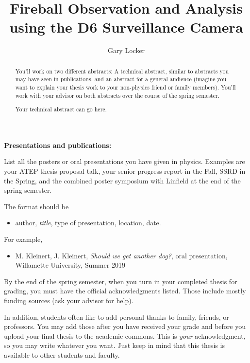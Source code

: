 \documentclass[12pt]{report}
\begin{document}
\title{Fireball Observation and Analysis using the D6 Surveillance Camera}
\author{Gary Locker}

\maketitle


\newpage

\begin{center}
\textbf{Presentations and publications:}
\end{center}

List all the posters or oral presentations you have given in physics. Examples are your ATEP thesis proposal talk, your senior progress report in the Fall, SSRD in the Spring, and the combined poster symposium with Linfield at the end of the spring semester.

The format should be 

\begin{itemize}
    \item author, \textit{title}, type of presentation, location, date. 
\end{itemize}

For example,
\begin{itemize}
\item M. Kleinert, J. Kleinert, \textit{Should we get another dog?}, oral presentation, Willamette University, Summer 2019
\end{itemize}

\newpage

\begin{acknowledgments}
By the end of the spring semester, when you turn in your completed thesis for grading, you must have the official acknowledgments listed. Those include mostly funding sources (ask your advisor for help). 

In addition, students often like to add personal thanks to family, friends, or professors. You may add those after you have received your grade and before you upload your final thesis to the academic commons. This is \textit{your} acknowledgment, so you may write whatever you want. Just keep in mind that this thesis is available to other students and faculty. 
\end{acknowledgments}

\newpage

\begin{abstract}
    \begin{general}
        You'll work on two different abstracts: A technical abstract, similar to abstracts you may have seen in publications, and an abstract for a general audience (imagine you want to explain your thesis work to your non-physics friend or family members). You'll work with your advisor on both abstracts over the course of the spring semester.
    \end{general}
    
    \begin{technical}
        Your technical abstract can go here.
    \end{technical}
\end{abstract}
\end{document}
